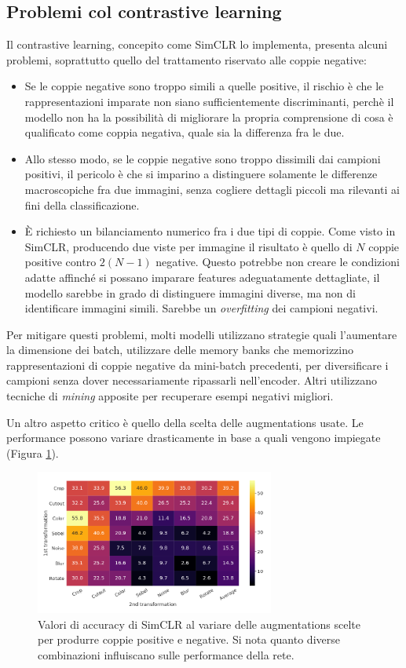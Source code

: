 \subsection{Problemi col contrastive learning}
Il contrastive learning, concepito come SimCLR lo implementa, presenta alcuni problemi, soprattutto quello del trattamento riservato alle coppie negative:
\begin{itemize}
    \item Se le coppie negative sono troppo simili a quelle positive, il rischio è che le rappresentazioni imparate non siano sufficientemente discriminanti, perchè il modello non ha la possibilità di migliorare la propria comprensione di cosa è qualificato come coppia negativa, quale sia la differenza fra le due.
    \item Allo stesso modo, se le coppie negative sono troppo dissimili dai campioni positivi, il pericolo è che si imparino a distinguere solamente le differenze macroscopiche fra due immagini, senza cogliere dettagli piccoli ma rilevanti ai fini della classificazione. 
    \item È richiesto un bilanciamento numerico fra i due tipi di coppie. Come visto in SimCLR, producendo due viste per immagine il risultato è quello di \(N\) coppie positive contro \(2(N-1)\) negative. Questo potrebbe non creare le condizioni adatte affinché si possano imparare features adeguatamente dettagliate, il modello sarebbe in grado di distinguere immagini diverse, ma non di identificare immagini simili. Sarebbe un \textit{overfitting} dei campioni negativi.
\end{itemize}
Per mitigare questi problemi, molti modelli utilizzano strategie quali l'aumentare la dimensione dei batch, utilizzare delle memory banks che memorizzino rappresentazioni di coppie negative da mini-batch precedenti, per diversificare i campioni senza dover necessariamente ripassarli nell'encoder. Altri utilizzano tecniche di \textit{mining} apposite per recuperare esempi negativi migliori.

Un altro aspetto critico è quello della scelta delle augmentations usate. Le performance possono variare drasticamente in base a quali vengono impiegate (Figura \ref{fig:augmentations_simclr}).

\begin{figure}[t]
    \centering
    \includegraphics[width=0.7\textwidth]{Immagini/ssl/augmentations_simclr.png}
    \caption{Valori di accuracy di SimCLR al variare delle augmentations scelte per produrre coppie positive e negative. Si nota quanto diverse combinazioni influiscano sulle performance della rete.}
    \label{fig:augmentations_simclr}
\end{figure}

